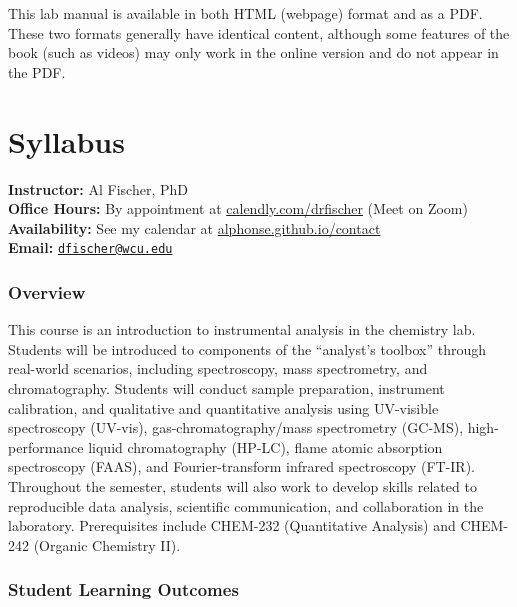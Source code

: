 \documentclass[]{tufte-book}
\begin{document}
This lab manual is available in both HTML (webpage) format and as a PDF. These two formats generally have identical content, although some features of the book (such as videos) may only work in the online version and do not appear in the PDF.

\hypertarget{syllabus}{%
\chapter*{Syllabus}\label{syllabus}}

\textbf{Instructor:} Al Fischer, PhD\\
\textbf{Office Hours:} By appointment at \href{http://www.calendly.com/drfischer}{calendly.com/drfischer} (Meet on Zoom)\\
\textbf{Availability:} See my calendar at \href{\%7B\%7Bsite.baseurl\%7D\%7D/contact}{alphonse.github.io/contact}\\
\textbf{Email:} \href{mailto:dfischer@wcu.edu}{\nolinkurl{dfischer@wcu.edu}}

\hypertarget{overview-1}{%
\subsection*{Overview}\label{overview-1}}

This course is an introduction to instrumental analysis in the chemistry lab. Students will be introduced to components of the ``analyst's toolbox'' through real-world scenarios, including spectroscopy, mass spectrometry, and chromatography. Students will conduct sample preparation, instrument calibration, and qualitative and quantitative analysis using UV-visible spectroscopy (UV-vis), gas-chromatography/mass spectrometry (GC-MS), high-performance liquid chromatography (HP-LC), flame atomic absorption spectroscopy (FAAS), and Fourier-transform infrared spectroscopy (FT-IR). Throughout the semester, students will also work to develop skills related to reproducible data analysis, scientific communication, and collaboration in the laboratory. Prerequisites include CHEM-232 (Quantitative Analysis) and CHEM-242 (Organic Chemistry II).

\hypertarget{student-learning-outcomes}{%
\subsection*{Student Learning Outcomes}\label{student-learning-outcomes}}
\end{document}
